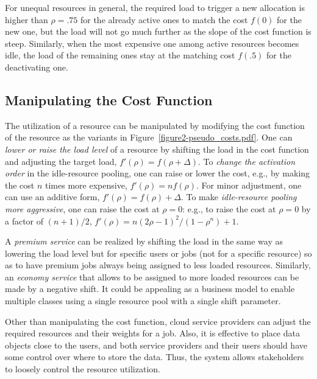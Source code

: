 For unequal resources in general, the required load to trigger a new
allocation is higher than $\rho = .75$ for the already
active ones to match the cost $f(0)$ for the new one, but the load
will not go much further as the slope of the cost function is steep.
Similarly, when the most expensive one among active resources becomes
idle, the load of the remaining ones stay at the matching cost
$f(.5)$ for the deactivating one.


\subsection{Manipulating the Cost Function}
\label{sec:variation}

The utilization of a resource can be manipulated by modifying the cost
function of the resource as the variants in Figure~\ref{figure2-pseudo_costs.pdf}.
One can {\em lower or raise the load level} of a resource by shifting
the load in the cost function and adjusting the target load,
$f'(\rho) = f(\rho + \Delta)$.
To {\em change the activation order} in the idle-resource pooling,
one can raise or lower the cost,
e.g., by making the cost  $n$ times more expensive, $f'(\rho) = n f(\rho)$.
For minor adjustment, one can use an additive form,
$f'(\rho) = f(\rho) + \Delta$.
To make {\em idle-resource pooling more aggressive},
one can raise the cost at $\rho = 0$:
e.g., to raise the cost at $\rho = 0$ by a factor of $(n+1)/2$,
$f'(\rho) = n (2\rho - 1)^{2}/(1 - \rho^{n}) + 1$.

A {\em premium service} can be realized by shifting the load
in the same way as lowering the load level
but for specific users or jobs (not for a specific resource) so as to
have premium jobs always being assigned to less loaded resources.
Similarly, an {\em economy service} that allows to be assigned to more
loaded resources can be made by a negative shift.
It could be appealing as a business model to enable multiple classes using a single
resource pool with a single shift parameter.


Other than manipulating the cost function,
cloud service providers can adjust the required resources and their
weights for a job.  Also, it is effective to place data objects close to the
users, and both service providers and their users should have some
control over where to store the data.
Thus, the system allows stakeholders to loosely control the
resource utilization.

